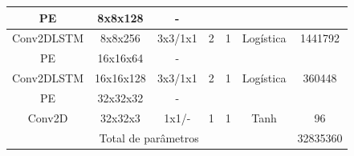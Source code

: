 \begin{table}[htbp]
\begin{adjustbox}{width=\columnwidth,center}
\begin{tabular}{|c|c|c|c|c|c|c|}
			PE             & 8x8x128                                                              & -                                                                                       &                &                        &                                                                       &                                                                         \\ \hline
			Conv2DLSTM      & 8x8x256                                                              & 3x3/1x1                                                                                 & 2              & 1                  & Logística                                                               & 1441792                                                                 \\ \hline
			PE             & 16x16x64                                                             & -                                                                                       &                &                        &                                                                       &                                                                         \\ \hline
			Conv2DLSTM      & 16x16x128                                                            & 3x3/1x1                                                                                 & 2              & 1                  & Logística                                                               & 360448                                                                  \\ \hline
			PE             & 32x32x32                                                             & -                                                                                       &                &                        &                                                                       &                                                                         \\ \hline
			Conv2D          & 32x32x3                                                              & 1x1/-                                                                                   & 1              & 1                  & Tanh                                                                  & 96                                                                      \\ \hline
			\multicolumn{6}{|c|}{Total de parâmetros}                                                                                                                                                                                                                                                          & 32835360                                                                \\ \hline
		\end{tabular}\quad
	\end{adjustbox}
	\label{table:aerc}
\end{table}
